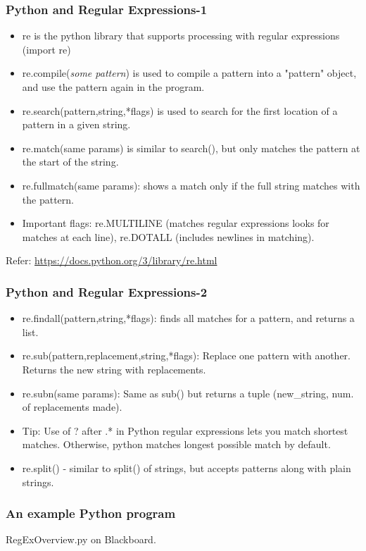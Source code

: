\documentclass{beamer}
\begin{document}
\begin{frame}
\frametitle{Python and Regular Expressions-1}
\begin{itemize}
\item re is the python library that supports processing with regular expressions (import re)
\item re.compile(\textit{some pattern}) is used to compile a pattern into a "pattern" object, and use the pattern again in the program.
\item re.search(pattern,string,*flags) is used to search for the first location of a pattern in a given string.
\item re.match(same params) is similar to search(), but only matches the pattern at the start of the string. 
\item re.fullmatch(same params): shows a match only if the full string matches with the pattern.
\item Important flags: re.MULTILINE (matches regular expressions looks for matches at each line), re.DOTALL (includes newlines in matching).
\end{itemize}
Refer: \url{https://docs.python.org/3/library/re.html}
\end{frame}

\begin{frame}
\frametitle{Python and Regular Expressions-2}
\begin{itemize}
\item re.findall(pattern,string,*flags): finds all matches for a pattern, and returns a list.
\item re.sub(pattern,replacement,string,*flags): Replace one pattern with another. Returns the new string with replacements.
\item re.subn(same params): Same as sub() but returns a tuple (new\_string, num. of replacements made).
\item Tip: Use of ? after .* in Python regular expressions lets you match shortest matches. Otherwise, python matches longest possible match by default.
\item re.split() - similar to split() of strings, but accepts patterns along with plain strings. 
\end{itemize}
\end{frame}

\begin{frame}
\frametitle{An example Python program}
RegExOverview.py on Blackboard.
\end{frame}
\end{document}

